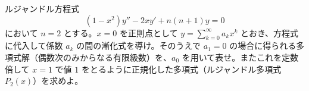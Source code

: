 
ルジャンドル方程式
\[
(1-x^{2})y'' - 2xy' + n(n+1)y = 0
\]
において $n=2$ とする。$x=0$ を正則点として $y = \displaystyle\sum_{k=0}^{\infty} a_k x^{k}$ とおき、方程式に代入して係数 $a_k$ の間の漸化式を導け。そのうえで $a_1 = 0$ の場合に得られる多項式解（偶数次のみからなる有限級数）を、$a_0$ を用いて表せ。またこれを定数倍して $x=1$ で値 $1$ をとるように正規化した多項式（ルジャンドル多項式 $P_2(x)$）を求めよ。
